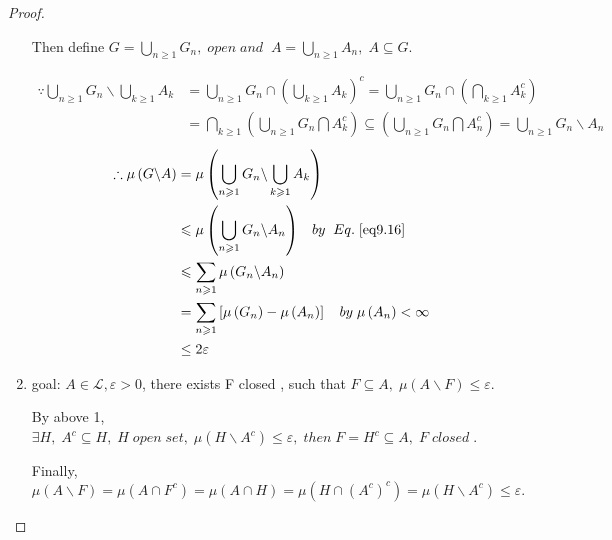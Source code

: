 \begin{proof}
\begin{enumerate}
        Then define $G = \bigcup\limits_{n \geqslant 1} {{G_n}} ,\;open\;and\;\;A = \bigcup\limits_{n \geqslant 1} {{A_n}} ,\;A \subseteq G$.
        
        \begin{equation}
        \begin{split}
		\because \bigcup\limits_{n \geqslant 1} {{G_n}} \backslash \bigcup\limits_{k \geqslant 1} {{A_k}}  & = \bigcup\limits_{n \geqslant 1} {{G_n}}  \cap {\left( {\bigcup\limits_{k \geqslant 1} {{A_k}} } \right)^c} = \bigcup\limits_{n \geqslant 1} {{G_n}}  \cap \left( {\bigcap\limits_{k \geqslant 1} {A_k^c} } \right)\\
						&   = \bigcap\limits_{k \geqslant 1} {\left( {\bigcup\limits_{n \geqslant 1} {{G_n}\bigcap {A_k^c} } } \right) \subseteq \left( {\bigcup\limits_{n \geqslant 1} {{G_n}\bigcap {A_n^c} } } \right)} =\bigcup\limits_{n \geqslant 1} {{G_n}\backslash {A_n}} 
        \end{split}
        \label{eq9.16}
        \end{equation}
        \begin{equation}
        \begin{split}
        \therefore \mu \left( {G\backslash A} \right) & = \mu \left( {\bigcup\limits_{n \geqslant 1} {{G_n}} \backslash \bigcup\limits_{k \geqslant 1} {{A_k}} } \right)\\
        											  & \leqslant \mu \left( {\bigcup\limits_{n \geqslant 1} {{G_n}} \backslash {A_n}} \right)\;\;\;by\;\;Eq. \;\ref{eq9.16}\\
        											  & \leqslant \sum\limits_{n \geqslant 1} {\mu \left( {{G_n}\backslash {A_n}} \right)} \\
        											  & = \sum\limits_{n \geqslant 1} {\left[ {\mu \left( {{G_n}} \right) - \mu \left( {{A_n}} \right)} \right]} \;\;\;\;by\;\mu \left( {{A_n}} \right) < \infty \\
        											  & \le 2 \varepsilon
        \end{split}
        \end{equation}
		\item goal: $ A \in \mathcal{L}, \varepsilon >0 $, there exists F closed , such that $F \subseteq A,\;\mu \left( {A\backslash F} \right) \leqslant \varepsilon $.
		
		By above 1, $\exists H,\;{A^c} \subseteq H,\;H\;open\;set,\;\mu \left( {H\backslash {A^c}} \right) \leqslant \varepsilon ,\;then\;F = {H^c} \subseteq A,\;F\;closed\;$.
		
		Finally,
		\begin{equation}
		\mu \left( {A\backslash F} \right) = \mu \left( {A \cap {F^c}} \right) = \mu \left( {A \cap H} \right) = \mu \left( {H \cap {{\left( {{A^c}} \right)}^c}} \right) = \mu \left( {H\backslash {A^c}} \right) \leqslant \varepsilon .
		\label{eq.9.18}
		\end{equation}
	\end{enumerate}
\end{proof}

